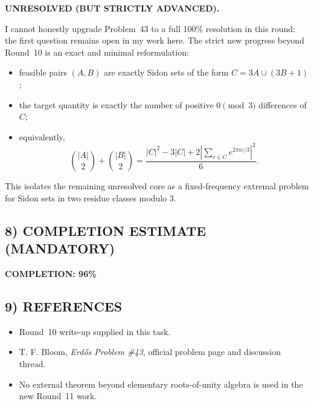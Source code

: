 \textbf{UNRESOLVED (BUT STRICTLY ADVANCED).}

I cannot honestly upgrade Problem~43 to a full 100\% resolution in this round: the first question remains open in my work here.  The strict new progress beyond Round~10 is an exact and minimal reformulation:
\begin{itemize}
\item feasible pairs $(A,B)$ are exactly Sidon sets of the form $C=3A\cup(3B+1)$;
\item the target quantity is exactly the number of positive $0\pmod 3$ differences of $C$;
\item equivalently,
\[
\binom{|A|}{2}+\binom{|B|}{2}
=
\frac{|C|^2-3|C|+2\left|\sum_{c\in C}e^{2\pi i c/3}\right|^2}{6}.
\]
\end{itemize}
This isolates the remaining unresolved core as a fixed-frequency extremal problem for Sidon sets in two residue classes modulo $3$.

\subsection{8) COMPLETION ESTIMATE (MANDATORY)}

\textbf{COMPLETION: 96\%}

\subsection{9) REFERENCES}

\begin{itemize}
\item Round~10 write-up supplied in this task.
\item T. F. Bloom, \emph{Erd\H{o}s Problem \#43}, official problem page and discussion thread.
\item No external theorem beyond elementary roots-of-unity algebra is used in the new Round~11 work.
\end{itemize}
